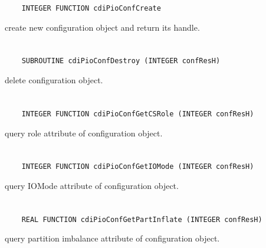 \begin{verbatim}
    INTEGER FUNCTION cdiPioConfCreate
\end{verbatim}

create new configuration object and return its handle.


\section*{\tt {}}

\begin{verbatim}
    SUBROUTINE cdiPioConfDestroy (INTEGER confResH)
\end{verbatim}

delete configuration object.


\section*{\tt {}}

\begin{verbatim}
    INTEGER FUNCTION cdiPioConfGetCSRole (INTEGER confResH)
\end{verbatim}

query role attribute of configuration object.


\section*{\tt {}}

\begin{verbatim}
    INTEGER FUNCTION cdiPioConfGetIOMode (INTEGER confResH)
\end{verbatim}

query IOMode attribute of configuration object.


\section*{\tt {}}

\begin{verbatim}
    REAL FUNCTION cdiPioConfGetPartInflate (INTEGER confResH)
\end{verbatim}

query partition imbalance attribute of
configuration object.


\section*{\tt {}}


